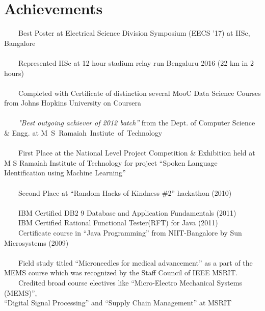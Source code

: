 \documentclass[a4paper,10pt]{article} %
\newcommand{\tabitem}{~~\llap{\textbullet}~~}
\begin{document}

\section{Achievements}
\tabitem Best Poster at Electrical Science Division Symposium (EECS '17) at IISc, Bangalore \\
\\
\tabitem Represented IISc at 12 hour stadium relay run Bengaluru 2016 (22 km in 2 hours)\\
\\
\tabitem Completed with Certificate of distinction several MooC Data Science Courses from Johns Hopkins University on Coursera\\
\\
\tabitem \textit{"Best outgoing achiever of 2012 batch”} from the Dept. of Computer Science \& Engg. at \mbox{M S Ramaiah Instiute of Technology} \\
\\
\tabitem First Place at the National Level Project Competition \& Exhibition held at M S Ramaiah Institute of Technology for project “Spoken Language Identification using Machine Learning”\\
\\
\tabitem Second Place at “Random Hacks of Kindness \#2” hackathon (2010)\\
\\
\tabitem IBM Certified DB2 9 Database and Application Fundamentals (2011)\\
\tabitem IBM Certified Rational Functional Tester(RFT) for Java (2011)\\
\tabitem Certificate course in “Java Programming” from NIIT-Bangalore by Sun Microsystems (2009)\\
\\
\tabitem Field study titled “Microneedles for medical advancement” as a part of the MEMS course which was recognized by the Staff Council of IEEE MSRIT.\\
\tabitem Credited broad course electives like “Micro-Electro Mechanical Systems (MEMS)”, \\“Digital Signal Processing” and “Supply Chain Management” at MSRIT \\
\\
\end{document}
